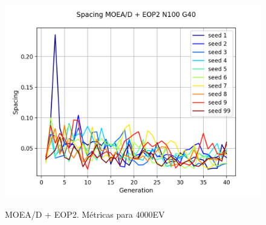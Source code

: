 \begin{figure}[H]
\includegraphics[scale=0.43]{figures/METRICS_EOP2/Spacing_N100_G40.png}\\
\caption{MOEA/D + EOP2. Métricas para 4000EV}
\label{fig:16}
\end{figure}


